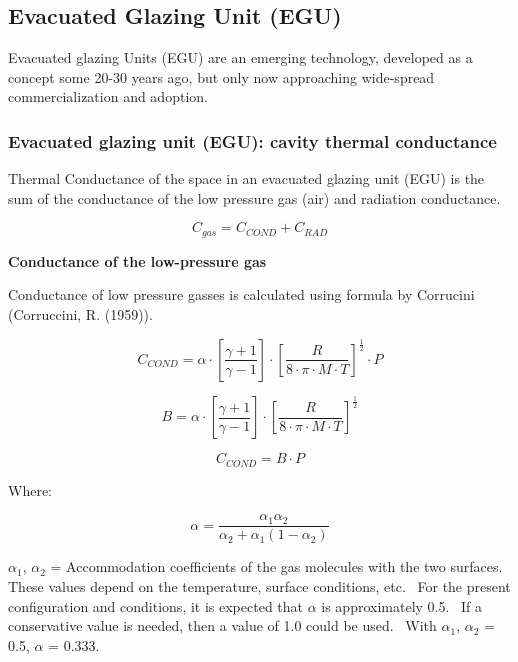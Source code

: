\subsection{Evacuated Glazing Unit (EGU)}\label{evacuated-glazing-unit-egu}

Evacuated glazing Units (EGU) are an emerging technology, developed as a concept some 20-30 years ago, but only now approaching wide-spread commercialization and adoption.

\subsubsection{Evacuated glazing unit (EGU): cavity thermal conductance}\label{evacuated-glazing-unit-egu-cavity-thermal-conductance}

Thermal Conductance of the space in an evacuated glazing unit (EGU) is the sum of the conductance of the low pressure gas (air) and radiation conductance.

\begin{equation}
{C_{gas}} = {C_{COND}} + {C_{RAD}}
\end{equation}

\textbf{Conductance of the low-pressure gas}

Conductance of low pressure gasses is calculated using formula by Corrucini (Corruccini, R. (1959)).

\begin{equation}
{C_{COND}} = \alpha  \cdot \left[ {\frac{{\gamma  + 1}}{{\gamma  - 1}}} \right] \cdot {\left[ {\frac{R}{{8 \cdot \pi  \cdot M \cdot T}}} \right]^{\frac{1}{2}}} \cdot P
\end{equation}

\begin{equation}
B = \alpha  \cdot \left[ {\frac{{\gamma  + 1}}{{\gamma  - 1}}} \right] \cdot {\left[ {\frac{R}{{8 \cdot \pi  \cdot M \cdot T}}} \right]^{\frac{1}{2}}}
\end{equation}

\begin{equation}
{C_{COND}} = B \cdot P
\end{equation}

Where:

\begin{equation}
\alpha  = \frac{{{\alpha_1}{\alpha_2}}}{{{\alpha_2} + {\alpha_1}\left( {1 - {\alpha_2}} \right)}}
\end{equation}

$\alpha$\(_{1}\), $\alpha$\(_{2}\) = Accommodation coefficients of the gas molecules with the two surfaces.~ These values depend on the temperature, surface conditions, etc.~ For the present configuration and conditions, it is expected that \emph{$\alpha$} is approximately 0.5.~ If a conservative value is needed, then a value of 1.0 could be used.~ With $\alpha$\(_{1}\), $\alpha$\(_{2}\) = 0.5, $\alpha$ = 0.333.

